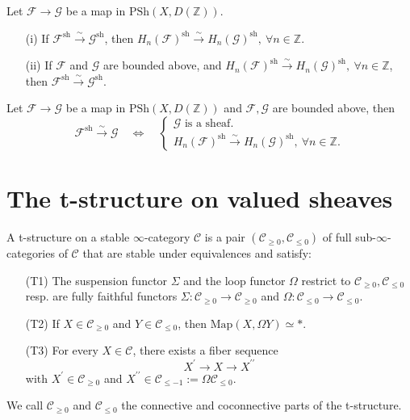 \documentclass[UTF8,12,a4paper]{ctexart}
\theoremstyle{definition}
\begin{document}
\cor 
Let $\mathcal{F}\rightarrow \mathcal{G}$ be a map in $\text{PSh}(X,D(\mathbb{Z}))$.
\begin{itemize}
	\item [(i)] If $\mathcal{F}^\text{sh}\stackrel{\sim}{\longrightarrow} \mathcal{G}^\text{sh}$, then $H_n(\mathcal{F})^\text{sh}\stackrel{\sim}{\longrightarrow}H_n(\mathcal{G})^\text{sh},\ \forall n\in\mathbb{Z}.$
	\item [(ii)] If $\mathcal{F}$ and $\mathcal{G}$ are bounded above, and $H_n(\mathcal{F})^\text{sh}\stackrel{\sim}{\longrightarrow}H_n(\mathcal{G})^\text{sh},\ \forall n\in\mathbb{Z}$, then $\mathcal{F}^\text{sh}\stackrel{\sim}{\longrightarrow} \mathcal{G}^\text{sh}$.
\end{itemize}


\cor 
Let $\mathcal{F}\rightarrow \mathcal{G}$ be a map in $\text{PSh}(X,D(\mathbb{Z}))$ and $\mathcal{F}, \mathcal{G}$ are bounded above, then 
$$
\mathcal{F}^\text{sh}\stackrel{\sim}{\rightarrow} \mathcal{G}\quad \iff\quad 
\begin{cases}
\mathcal{G} \text{ is a sheaf.}\\
H_n(\mathcal{F})^\text{sh}\stackrel{\sim}{\rightarrow}H_n(\mathcal{G})^\text{sh},\ \forall n\in\mathbb{Z}.
\end{cases}
$$

\dfn 


\prop 









\newpage
\section{The t-structure on valued sheaves}

\dfn
A t-structure on a stable $\infty$-category $\mathcal{C}$ is a pair $(\mathcal{C}_{\geq0},\mathcal{C}_{\leq 0})$ of full sub-$\infty$-categories of $\mathcal{C}$ that are stable under equivalences and satisfy:
\begin{itemize}
	\item[(T1)] The suspension functor $\Sigma$ and the loop functor $\Omega$ restrict to $\mathcal{C}_{\geq0},\mathcal{C}_{\leq 0}$ resp. are fully faithful functors $\Sigma:\mathcal{C}_{\geq0}\to \mathcal{C}_{\geq0}$ and $\Omega:\mathcal{C}_{\leq0}\to \mathcal{C}_{\leq0}.$
	\item [(T2)] If $X\in \mathcal{C}_{\geq0}$ and $Y\in \mathcal{C}_{\leq0}$, then $\text{Map}(X,\Omega Y)\simeq *.$
	\item [(T3)] For every $X\in \mathcal{C}$, there exists a fiber sequence
	$$
	X^\prime\longrightarrow X\longrightarrow X^{\prime\prime}
	$$
	with $X^\prime \in \mathcal{C}_{\geq0}$ and $X^{\prime\prime} \in \mathcal{C}_{\leq -1}:=\Omega \mathcal{C}_{\leq0}.$  
\end{itemize}
We call $\mathcal{C}_{\geq0}$ and $\mathcal{C}_{\leq0}$ the connective and coconnective parts of the t-structure.
~\\
\end{document}
